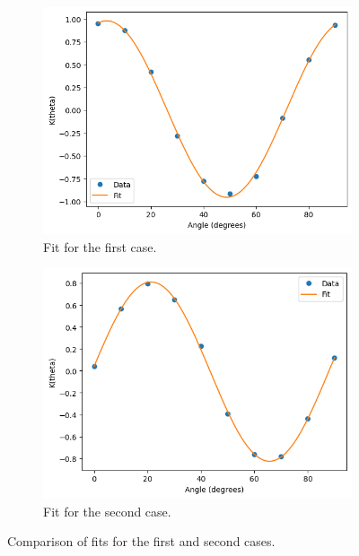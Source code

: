 \begin{figure}[h!]
    \centering
    \begin{subfigure}[t]{0.45\textwidth}
        \centering
        \includegraphics[width=\textwidth]{figures/fit_1.png}
        \caption{Fit for the first case.}
        \label{fig:fit_1}
    \end{subfigure}
    \hfill
    \begin{subfigure}[t]{0.45\textwidth}
        \centering
        \includegraphics[width=\textwidth]{figures/fit_2.png}
        \caption{Fit for the second case.}
        \label{fig:fit_2}
    \end{subfigure}
    \caption{Comparison of fits for the first and second cases.}
    \label{fig:fit_comparison}
\end{figure}




